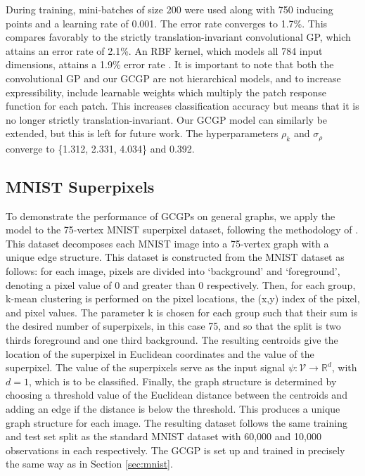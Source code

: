 \documentclass{article}
\begin{document}
During training, mini-batches of size 200 were used along with 750 inducing points and a learning rate of 0.001. The error rate converges to 1.7\%. This compares favorably to the strictly translation-invariant convolutional GP, which attains an error rate of 2.1\%. An RBF kernel, which models all 784 input dimensions, attains a 1.9\% error rate \citep{convgp}. It is important to note that both the convolutional GP and our GCGP are not hierarchical models, and to increase expressibility, \citet{convgp} include learnable weights which multiply the patch response function for each patch. This increases classification accuracy but means that it is no longer strictly translation-invariant. Our GCGP model can similarly be extended, but this is left for future work. The hyperparameters $\rho_k$ and $\sigma_\rho$ converge to \{1.312, 2.331, 4.034\} and 0.392.


\subsection{MNIST Superpixels}
To demonstrate the performance of GCGPs on general graphs, we apply the model to the 75-vertex MNIST superpixel dataset, following the methodology of \citet{moNet}. This dataset decomposes each MNIST image into a 75-vertex graph with a unique edge structure. This dataset is constructed from the MNIST dataset as follows: for each image, pixels are divided into `background' and `foreground', denoting a pixel value  of 0 and greater than 0 respectively. Then, for each group, k-mean clustering is performed on the pixel locations, the (x,y) index of the pixel, and pixel values. The parameter k is chosen for each group such that their sum is the desired number of superpixels, in this case 75, and so that the split is two thirds foreground and one third background. The resulting centroids give the location of the superpixel in Euclidean coordinates and the value of the superpixel. The value of the superpixels serve as the input signal $\psi: \mathcal{V} \to \mathbb{R}^d$, with $d=1$, which is to be classified. Finally, the graph structure is determined by choosing a threshold value of the Euclidean distance between the centroids and adding an edge if the distance is below the threshold. This produces a unique graph structure for each image. The resulting dataset follows the same training and test set split as the standard MNIST dataset with 60,000 and 10,000 observations in each respectively. The GCGP is set up and trained in precisely the same way as in Section \ref{sec:mnist}. 
\end{document}
